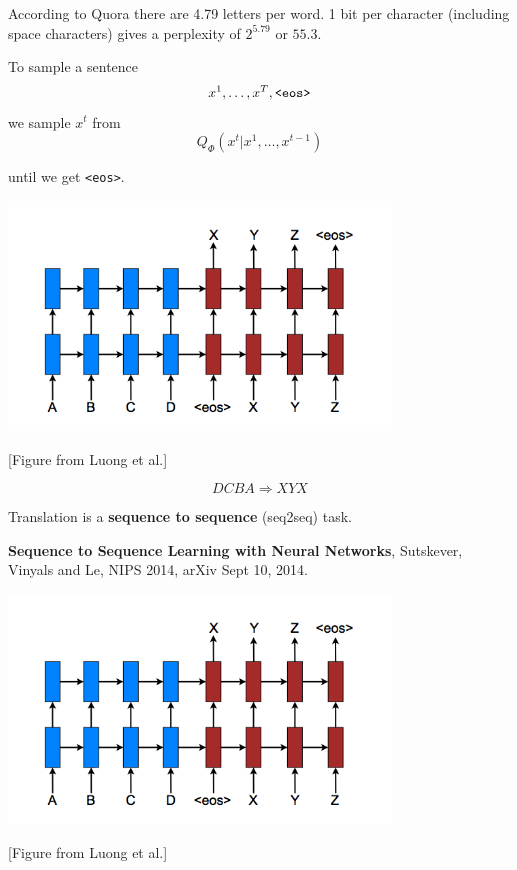 {\vfill
According to Quora there are 4.79 letters per word.  1 bit per character (including space characters) gives a perplexity of $2^{5.79}$ or $55.3$.


To sample a sentence
\vfill
$$x^1,\ldots, x^T, \mbox{\tt <eos>}$$
\vfill
we sample $x^t$ from
\vfill
$$Q_\Phi(x^t|x^1,\ldots,x^{t-1})$$

\vfill
until we get {\tt <eos>}.


\centerline{\includegraphics[width = 4in]{../images/SeqToSeq}}

\centerline{\large [Figure from Luong et al.]}

$$DCBA \Rightarrow XYX$$

\vfill
Translation is a {\bf sequence to sequence} (seq2seq) task.

\vfill
{\bf Sequence to Sequence Learning with Neural Networks}, Sutskever, Vinyals and Le, NIPS 2014, arXiv Sept 10, 2014.


\centerline{\includegraphics[width = 4in]{../images/SeqToSeq}}

\centerline{\large [Figure from Luong et al.]}

}

